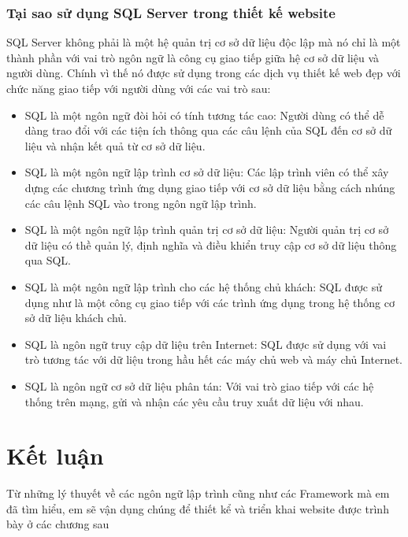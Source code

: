 \subsubsection{Tại sao sử dụng SQL Server trong thiết kế website}
SQL Server không phải là một hệ quản trị cơ sở dữ liệu độc lập mà nó chỉ là một thành phần với vai trò ngôn ngữ là công cụ giao tiếp giữa hệ cơ sở dữ liệu và người dùng. Chính vì thế nó được sử dụng trong các dịch vụ thiết kế web đẹp với chức năng giao tiếp với người dùng với các vai trò sau:
\begin{itemize}
\item	SQL là một ngôn ngữ đòi hỏi có tính tương tác cao: Người dùng có thể dễ dàng trao đổi với các tiện ích thông qua các câu lệnh của SQL đến cơ sở dữ liệu và nhận kết quả từ cơ sở dữ liệu.
\item	SQL là một ngôn ngữ lập trình cơ sở dữ liệu: Các lập trình viên có thể xây dựng các chương trình ứng dụng giao tiếp với cơ sở dữ liệu bằng cách nhúng các câu lệnh SQL vào trong ngôn ngữ lập trình.
\item	SQL là một ngôn ngữ lập trình quản trị cơ sở dữ liệu: Người quản trị cơ sở dữ liệu có thề quản lý, định nghĩa và điều khiển truy cập cơ sở dữ liệu thông qua SQL.
\item	SQL là một ngôn ngữ lập trình cho các hệ thống chủ khách: SQL được sử dụng như là một công cụ giao tiếp với các trình ứng dụng trong hệ thống cơ sở dữ liệu khách chủ.
\item	SQL là ngôn ngữ truy cập dữ liệu trên Internet: SQL được sử dụng với vai trò tương tác với dữ liệu trong hầu hết các máy chủ web và máy chủ Internet.
\item	SQL là ngôn ngữ cơ sở dữ liệu phân tán: Với vai trò giao tiếp với các hệ thống trên mạng, gửi và nhận các yêu cầu truy xuất dữ liệu với nhau.

\end{itemize}

\section{Kết luận}
Từ những lý thuyết về các ngôn ngữ lập trình cũng như các Framework mà em đã tìm hiểu, em sẽ vận dụng chúng để thiết kể và triển khai website được trình bày ở các chương sau

 




